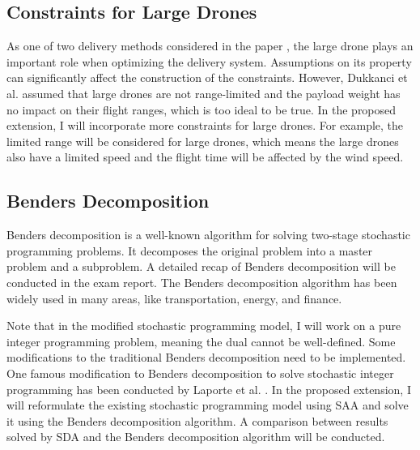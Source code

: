 \documentclass{lxaiproposal}
\begin{document}
\subsection{Constraints for Large Drones}
\vspace*{-2mm}
As one of two delivery methods considered in the paper \cite{dukkanci2023drones}, the large drone plays an important role when optimizing the delivery system. Assumptions on its property can significantly affect the construction of the constraints. However, Dukkanci et al. assumed that large drones are not range-limited and the payload weight has no impact on their flight ranges, which is too ideal to be true. In the proposed extension, I will incorporate more constraints for large drones. For example, the limited range will be considered for large drones, which means the large drones also have a limited speed and the flight time will be affected by the wind speed.


\subsection{Benders Decomposition}
\vspace*{-2mm}
Benders decomposition is a well-known algorithm for solving two-stage stochastic programming problems. It decomposes the original problem into a master problem and a subproblem. A detailed recap of Benders decomposition will be conducted in the exam report. The Benders decomposition algorithm has been widely used in many areas, like transportation, energy, and finance.

Note that in the modified stochastic programming model, I will work on a pure integer programming problem, meaning the dual cannot be well-defined. Some modifications to the traditional Benders decomposition need to be implemented. One famous modification to Benders decomposition to solve stochastic integer programming has been conducted by Laporte et al. \cite{laporte1993integer}. In the proposed extension, I will reformulate the existing stochastic programming model using SAA and solve it using the Benders decomposition algorithm. A comparison between results solved by SDA and the Benders decomposition algorithm will be conducted.
\end{document}

